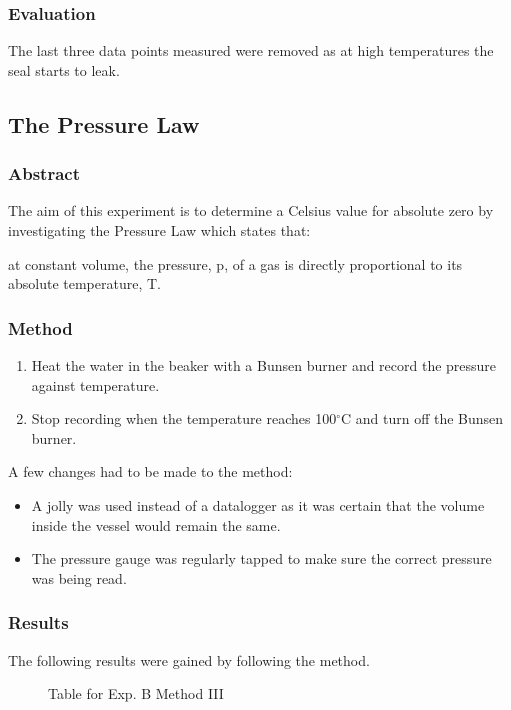 \subsubsection{Evaluation}
The last three data points measured were removed as at high temperatures the seal starts to leak.

\subsection{The Pressure Law}

\subsubsection{Abstract}
The aim of this experiment is to determine a Celsius value for absolute zero by investigating the Pressure Law which states that:
\begin{quoting}
  at constant volume, the pressure, p, of a gas is directly proportional to its absolute temperature, T.
\end{quoting}

\subsubsection{Method}
\begin{enumerate}
  \item Heat the water in the beaker with a Bunsen burner and record the pressure against temperature.
  \item Stop recording when the temperature reaches 100$^\circ$C and turn off the Bunsen burner.
\end{enumerate}
A few changes had to be made to the method:
\begin{itemize}
  \item A jolly was used instead of a datalogger as it was certain that the volume inside the vessel would remain the same.
  \item The pressure gauge was regularly tapped to make sure the correct pressure was being read.
\end{itemize}

\subsubsection{Results}
The following results were gained by following the method.
\begin{figure}
  \caption{Table for Exp. B Method III}
\end{figure}


